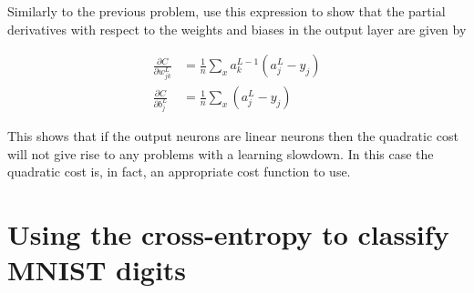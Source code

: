 \documentclass[a4paper,11pt,twoside]{report}
\begin{document}
\begin{itemize}
Similarly to the previous problem, use this expression to show that the partial derivatives with respect to the weights and biases in the output layer are given by

\begin{equation}
\begin{aligned}
\frac{\partial C}{\partial w_{jk}^L}&=\frac{1}{n}\sum_x a^{L-1}_k\left(a_j^L-y_j\right)\\
\frac{\partial C}{\partial b_{j}^L}&=\frac{1}{n}\sum_x \left(a_j^L-y_j\right)
\end{aligned}
\label{eq: partial derivative quadratic cost with resp w and b }
\end{equation}

This shows that if the output neurons are linear neurons then the quadratic cost will not give rise to any problems with a learning slowdown. In this case the quadratic cost is, in fact, an appropriate cost function to use.
\end{itemize}

\section{Using the cross-entropy to classify MNIST digits}
\label{sec: Using the cross-entropy to classify MNIST digits}
\end{document}
